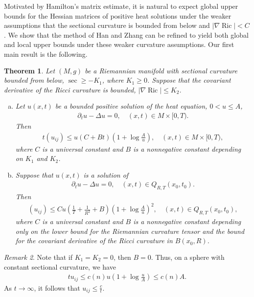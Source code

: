 \documentclass{amsart}
\newtheorem{theorem}{Theorem}[section]
\theoremstyle{definition}
\theoremstyle{remark}
\newtheorem{remark}[theorem]{Remark}
\numberwithin{equation}{section}
\begin{document}
Motivated by Hamilton's matrix estimate, it is natural to expect global upper bounds for the Hessian matrices of positive heat solutions under the weaker assumptions that the sectional curvature is bounded from below and $|\nabla \operatorname{Ric}|<C$. We show that the method of Han and Zhang \cite{Han-Zhang} can be refined to yield both global and local upper bounds under these weaker curvature assumptions. Our first main result is the following.
\begin{theorem}\label{Riemannian}
Let $(M,g)$ be a Riemannian manifold with sectional curvature bounded from below, $\operatorname{sec}\geq -K_{1}$, where $K_{1}\geq 0$. Suppose that the covariant derivative of the Ricci curvature is bounded, $|\nabla \operatorname{Ric}|\leq K_{2}$. 
 \begin{enumerate}[(a)]
 \item Let $u(x,t)$ be a bounded positive solution of the heat equation, $0<u\leq A$,
\begin{align}\label{Heat equation}
\partial_{t}u-\Delta u=0, \quad (x,t)\in M\times [0,T).
\end{align}
Then 
\begin{align*}
t(u_{ij})\leq u(C+Bt)(1+\log \frac{A}{u}), \quad (x,t)\in M\times [0,T),
\end{align*}
where $C$ is a universal constant and $B$ is a nonnegative constant depending on $K_{1}$ and $K_{2}$.

 \item Suppose that $u(x,t)$ is a solution of 
\begin{align*}
\partial_{t}u-\Delta u=0, \quad (x,t)\in Q_{R,T}(x_{0},t_{0}).
\end{align*}
Then 
\begin{align*}
(u_{ij})\leq Cu\left(\frac{1}{T}+\frac{1}{R^{2}}+B\right)\left(1+\log \frac{A}{u}\right)^{2}, \quad (x,t)\in Q_{R,T}(x_{0},t_{0}),
\end{align*}
where $C$ is a universal constant and $B$ is a nonnegative constant depending only on the lower bound for the Riemannian curvature tensor and the bound for the covariant derivative of the Ricci curvature in $B\left(x_0, R\right)$.
  \end{enumerate}
\end{theorem}

\begin{remark}
Note that if $K_{1}=K_{2}=0$, then $B=0$. Thus, on a sphere with constant sectional curvature, we have 
\begin{align*}
tu_{ij}\leq c(n)u(1+\log \frac{u}{A})\leq c(n)A.
\end{align*}
As $t\rightarrow \infty$, it follows that $u_{ij}\leq \frac{c}{t}$.
\end{remark}
\end{document}
